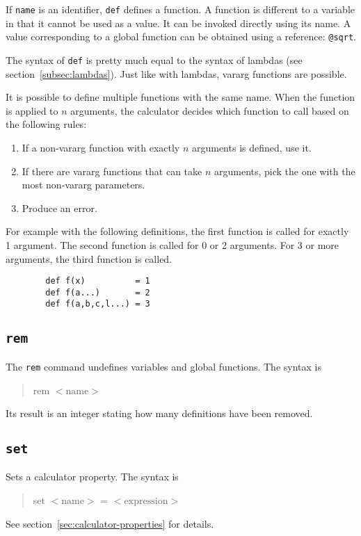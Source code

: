 \documentclass[10pt]{article}
\newcommand{\argument}[1]{{${\big<}\mathrm{#1}{\big>}$}}
\newenvironment{code}{\begin{quote}\ttfamily}{\end{quote}}
\begin{document}
    If \verb|name| is an identifier, \verb|def| defines a function.
    A function is different to a variable in that it cannot be used as a value.
    It can be invoked directly using its name.
    A value corresponding to a global function can be obtained using a reference: \verb|@sqrt|.
    
    The syntax of \verb|def| is pretty much equal to the syntax of lambdas (see section~\ref{subsec:lambdas}).
    Just like with lambdas, vararg functions are possible.
    
    It is possible to define multiple functions with the same name.
    When the function is applied to $ n $ arguments, the calculator decides which function to call based on the following rules:
    \begingroup
    \setlength{\parskip}{0pt}
    \begin{enumerate}
        \item If a non-vararg function with exactly $ n $ arguments is defined, use it.
        \item If there are vararg functions that can take $ n $ arguments, pick the one with the most non-vararg parameters.
        \item Produce an error.
    \end{enumerate}
    \endgroup
    For example with the following definitions, the first function is called for exactly 1 argument.
    The second function is called for 0 or 2 arguments.
    For 3 or more arguments, the third function is called.
    \begin{verbatim}
        def f(x)          = 1
        def f(a...)       = 2
        def f(a,b,c,l...) = 3
    \end{verbatim}
    
    \subsection{\texttt{rem}}\label{subsec:cmd-rem}
    The \verb|rem| command undefines variables and global functions.
    The syntax is
    \begin{code}
        rem \argument{name}
    \end{code}
    Its result is an integer stating how many definitions have been removed.
    
    \subsection{\texttt{set}}\label{subsec:cmd-set}
    Sets a calculator property.
    The syntax is
    \begin{code}
        set \argument{name} = \argument{expression}
    \end{code}
    See section~\ref{sec:calculator-properties} for details.
    
\end{document}
